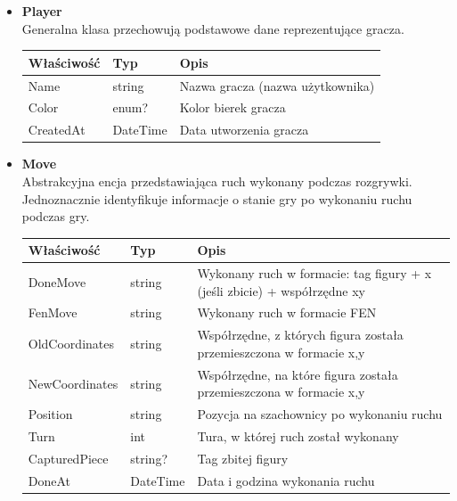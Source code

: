 \documentclass[twoside]{projektInzynierskiMS1}
\begin{document}
\begin{itemize}
    \item \textbf{Player}\\
    Generalna klasa przechowują podstawowe dane reprezentujące gracza.
    \renewcommand{\arraystretch}{1.2}
    \begin{longtable}{|m{4cm}|m{2cm}|m{8cm}|}
        \hline
        \rowcolor{lightgray}
        \textbf{Właściwość} & \textbf{Typ} & \textbf{Opis} \\ \hline
        \endhead
        \hline
        Name & string & Nazwa gracza (nazwa użytkownika) \\ \hline
        Color & enum? & Kolor bierek gracza \\ \hline
        CreatedAt & DateTime & Data utworzenia gracza \\ \hline
    \end{longtable}

\newpage

    \item \textbf{Move}\\
    Abstrakcyjna encja przedstawiająca ruch wykonany podczas rozgrywki. Jednoznacznie identyfikuje informacje o stanie gry po wykonaniu ruchu podczas gry.
    \renewcommand{\arraystretch}{1.2}
    \begin{longtable}{|m{4cm}|m{2cm}|m{8cm}|}
        \hline
        \rowcolor{lightgray}
        \textbf{Właściwość} & \textbf{Typ} & \textbf{Opis} \\ \hline
        \endhead
        \hline
        DoneMove & string & Wykonany ruch w formacie: tag figury + x (jeśli zbicie) + współrzędne xy \\ \hline
        FenMove & string & Wykonany ruch w formacie FEN \\ \hline
        OldCoordinates & string & Współrzędne, z których figura została przemieszczona w formacie x,y \\ \hline
        NewCoordinates & string & Współrzędne, na które figura została przemieszczona w formacie x,y \\ \hline
        Position & string & Pozycja na szachownicy po wykonaniu ruchu \\ \hline
        Turn & int & Tura, w której ruch został wykonany \\ \hline
        CapturedPiece & string? & Tag zbitej figury \\ \hline
        DoneAt & DateTime & Data i godzina wykonania ruchu \\ \hline
    \end{longtable}


\end{itemize}
\end{document}
